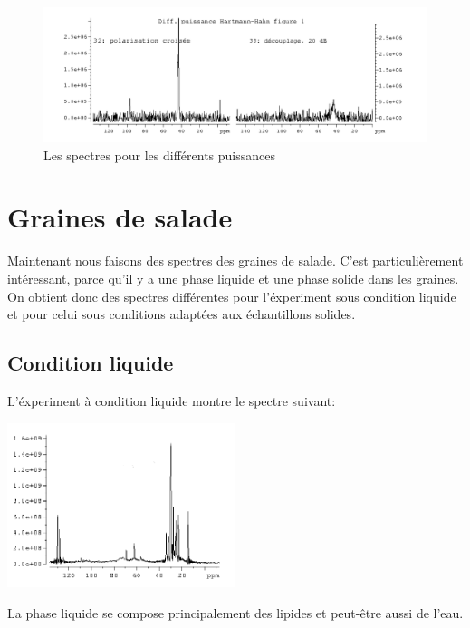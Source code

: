 \documentclass[a4paper,12pt]{scrartcl}
\begin{document}
\begin{figure}[H]
 \includegraphics[width=\textwidth]{bilder/figure7.png}
    \caption{Les spectres pour les différents puissances}
   \end{figure}
 

 \section{Graines de salade}
Maintenant nous faisons des spectres des graines de salade. C'est particulièrement	 intéressant, parce qu'il y a une phase liquide et une phase solide dans les graines. On obtient donc des spectres différentes pour l'éxperiment sous condition liquide et pour celui sous conditions adaptées aux échantillons solides.  
  \subsection{Condition liquide}
L'éxperiment à condition liquide montre le spectre suivant: 
 \begin{figurehere}
    \center
    \includegraphics[width=0.5\textwidth]{bilder/graine_liquide.png}
    \caption{graine de salade: condition liquide}
   \end{figurehere}
La phase liquide se compose principalement des lipides et peut-être aussi de l'eau. 
\end{document}
